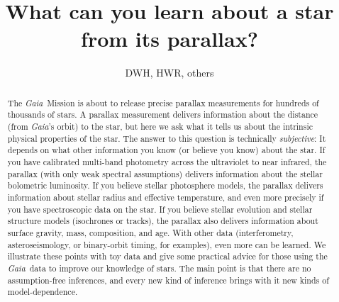 \documentclass[12pt, preprint]{aastex}
\newcommand{\project}[1]{\textsl{#1}}
\newcommand{\gaia}{\project{Gaia}}
\begin{document}
\title{What can you learn about a star from its parallax?}
\author{DWH, HWR, others}

\begin{abstract}
The \gaia\ Mission is about to release precise parallax measurements
for hundreds of thousands of stars.
A parallax measurement delivers information about the distance (from
\gaia's orbit) to the star, but here we ask what it tells us about the
intrinsic physical properties of the star.
The answer to this question is technically \emph{subjective}: It depends on
what other information you know (or believe you know) about the star.
If you have calibrated multi-band photometry across the ultraviolet to
near infrared, the parallax (with only weak spectral assumptions)
delivers information about the stellar bolometric luminosity.
If you believe stellar photosphere models, the parallax delivers
information about stellar radius and effective temperature, and even
more precisely if you have spectroscopic data on the star.
If you believe stellar evolution and stellar structure models
(isochrones or tracks), the parallax also delivers information about
surface gravity, mass, composition, and age.
With other data (interferometry, asteroseismology, or binary-orbit
timing, for examples), even more can be learned.
We illustrate these points with toy data and give some practical
advice for those using the \gaia\ data to improve our knowledge of
stars.
The main point is that there are no assumption-free inferences, and
every new kind of inference brings with it new kinds of
model-dependence.
\end{abstract}
\end{document}
